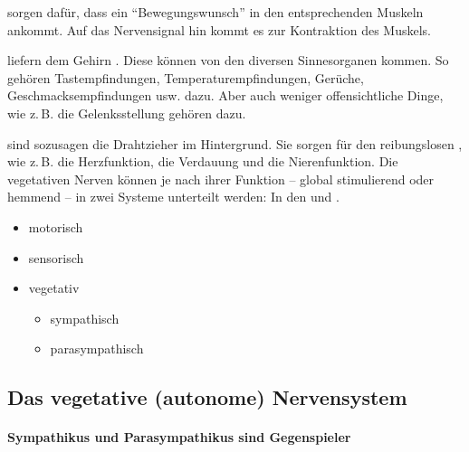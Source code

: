 {%
 sorgen dafür, dass ein
\protect\enquote{Bewegungswunsch} in den entsprechenden
Muskeln ankommt. Auf das Nervensignal hin kommt es zur
Kontraktion des Muskels.

 liefern dem Gehirn
. Diese können von den diversen
Sinnesorganen kommen. So gehören Tastempfindungen,
Temperaturempfindungen, Gerüche, Geschmacksempfindungen usw.
dazu. Aber auch weniger offensichtliche Dinge, wie z.\,B.
die Gelenksstellung gehören dazu.

 sind sozusagen die Drahtzieher im
Hintergrund. Sie sorgen für den reibungslosen , wie z.\,B. die Herzfunktion, die
Verdauung und die Nierenfunktion. Die vegetativen Nerven
können je nach ihrer Funktion -- global stimulierend oder
hemmend --  in zwei Systeme unterteilt werden: In den
 und .
}
{
\begin{itemize}
    \item motorisch  
    \item sensorisch 
    \item vegetativ 
    \begin{itemize}
        \item sympathisch
        \item parasympathisch
    \end{itemize}
\end{itemize}
}{}{}{}

\subsection{Das vegetative (autonome)  Nervensystem}
\label{topic:vegetatives-nervensystem}
\label{topic:nervensystem-vegetatives}


 
\paragraph{Sympathikus  und Parasympathikus  sind Gegenspieler}~
\label{topic:sympathikus}
\label{topic:parasymapthikus} 

\vspace{\baselineskip}

